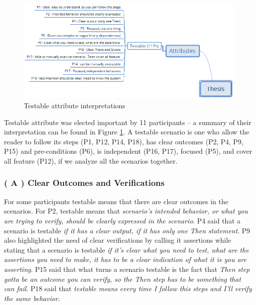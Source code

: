 \begin{figure}[t]
	\centering
	\includegraphics[scale=0.8]{images/testable_attribute}
	\caption[ Testable attribute interpretations]{Testable attribute interpretations}
	\label{fig:testable_attribute}
\end{figure}

Testable attribute was elected important by 11 participants -- a summary of their interpretation can be found in Figure \ref{fig:testable_attribute}. A testable scenario is one who allow the reader to follow its steps (P1, P12, P14, P18), has clear outcomes (P2, P4, P9, P15) and pre-conditions (P6), is independent (P16, P17), focused (P5), and cover all feature (P12), if we analyze all the scenarios together.

\subsubsection{\textbf{( A ) Clear Outcomes and Verifications}}
For some participants testable means that there are clear outcomes in the scenarios. For P2, testable means that \textit{scenario's intended behavior, or what you are trying to verify, should be clearly expressed in the scenario}. P4 said that a scenario is testable \textit{if it has a clear output, if it has only one Then statement}. P9 also highlighted the need of clear verifications by calling it assertions while stating that a scenario is testable \textit{if it's clear what you need to test, what are the assertions you need to make, it has to be a clear indication of what it is you are asserting}. P15 said that what turns a scenario testable is the fact that \textit{Then step gotta be an outcome you can verify, so the Then step has to be something that can fail}. P18 said that \textit{testable means every time I follow this steps and I'll verify the same behavior}.

